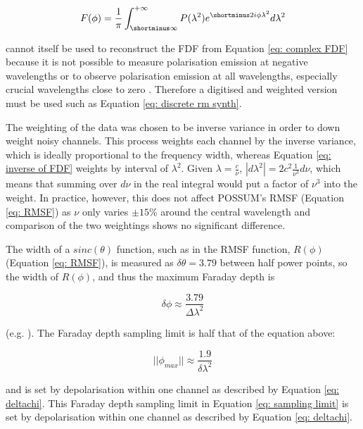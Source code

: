 \begin{equation}
    F(\phi)=\frac{1}{\pi}\int^{+\infty}_{\shortminus\infty}P(\lambda^2)e^{\shortminus2i\phi\lambda^2}d\lambda^2
    \label{eq: inverse of FDF}
\end{equation}

\noindent cannot itself be used to reconstruct the FDF from Equation \ref{eq: complex FDF} because it is not possible to measure polarisation emission at negative wavelengths or to observe polarisation emission at all wavelengths, especially crucial wavelengths close to zero \cite{Li_2011}. Therefore a digitised and weighted version must be used such as Equation \ref{eq: discrete rm synth}. 





The weighting of the data was chosen to be inverse variance in order to down weight noisy channels. This process weights each channel by the inverse variance, which is ideally proportional to the frequency width, whereas Equation \ref{eq: inverse of FDF} weights by interval of $\lambda^2$. Given $\lambda = \frac{c}{\nu}$, $|d\lambda^2| = 2c^2\frac{1}{\nu^3}d\nu$, which means that summing over $d\nu$ in the real integral would put a factor of $\nu^3$ into the weight. In practice, however, this does not affect POSSUM's RMSF (Equation \ref{eq: RMSF}) as $\nu$ only varies $\pm 15 \%$ around the central wavelength and comparison of the two weightings shows no significant difference.


The width of a $sinc(\theta)$ function, such as in the RMSF function, $R(\phi)$ (Equation \ref{eq: RMSF}), is measured as $\delta\theta = 3.79$ between half power points, so the width of $R(\phi)$, and thus the maximum Faraday depth is 

\begin{equation}
    \delta\phi \approx \frac{3.79}{\Delta\lambda^2}
    \label{}
\end{equation}


\noindent (e.g. \cite{Dickey_2019}). The Faraday depth sampling limit is half that of the equation above:

\begin{equation}
    ||\phi_{max}|| \approx \frac{1.9}{\delta\lambda^2}
    \label{eq: sampling limit}
\end{equation}

\noindent and is set by depolarisation within one channel as described by Equation \ref{eq: deltachi}. This Faraday depth sampling limit in Equation \ref{eq: sampling limit} is set by depolarisation within one channel as described by Equation \ref{eq: deltachi}. 

